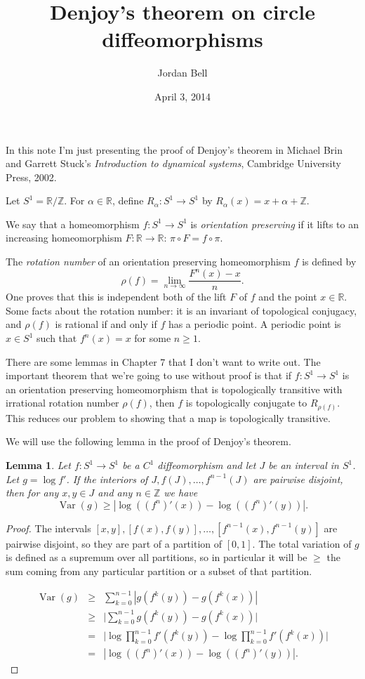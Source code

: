 \documentclass{article}
\newtheorem{lemma}[theorem]{Lemma}
\newcommand{\Var}[0]{\operatorname{Var}}
\theoremstyle{definition}
\begin{document}
\title{Denjoy's theorem on circle diffeomorphisms}
\author{Jordan Bell}
\date{April 3, 2014}
\maketitle

In this note I'm just presenting the proof of Denjoy's theorem in Michael Brin and Garrett Stuck's {\em Introduction
to dynamical systems}, Cambridge University Press, 2002. 

Let $S^1=\mathbb{R}/\mathbb{Z}$. For $\alpha \in \mathbb{R}$, define $R_\alpha:S^1 \to S^1$ by $R_\alpha(x)=x+\alpha
+\mathbb{Z}$.

We say that a homeomorphism $f:S^1 \to S^1$ is {\em orientation preserving} if it lifts to an increasing homeomorphism
$F:\mathbb{R} \to \mathbb{R}$: $\pi \circ F=f \circ \pi$.

The {\em rotation number} of an orientation preserving homeomorphism $f$ is defined by
\[
\rho(f)=\lim_{n \to \infty} \frac{F^n(x)-x}{n}.
\]
One proves that this is independent both of the lift $F$ of $f$ and the point $x \in \mathbb{R}$.
Some facts about the rotation number: it is an invariant of topological conjugacy, and $\rho(f)$ is rational if and only
if $f$ has a periodic point. A periodic point is $x \in S^1$ such that $f^n(x)=x$ for some $n \geq 1$.

There are some lemmas in Chapter 7 that I don't want to write out. The important theorem that
we're going to use without proof
is that if $f:S^1 \to S^1$ is an orientation preserving homeomorphism that is topologically
transitive with irrational rotation
number $\rho(f)$, then $f$ is topologically conjugate to $R_{\rho(f)}$. 
This reduces our problem to showing that a map is topologically transitive.

We will use the following lemma in the proof of Denjoy's theorem.

\begin{lemma}
Let $f:S^1 \to S^1$ be a $C^1$ diffeomorphism and
let $J$ be an interval in $S^1$. Let $g=\log f'$. If the interiors of $J,f(J),\ldots,f^{n-1}(J)$ are pairwise
disjoint, then for any $x, y \in J$ and any $n \in \mathbb{Z}$ we have
\[
\Var(g) \geq |\log((f^n)'(x))-\log((f^n)'(y))|.
\]
\end{lemma}
\begin{proof}
The intervals $[x,y], [f(x),f(y)], \ldots, [f^{n-1}(x),f^{n-1}(y)]$ are pairwise disjoint, so
they are part of a partition of $[0,1]$. The total variation of $g$ is defined as a supremum
over all partitions, so in particular it will be $\geq$ the sum coming from any particular
partition or a subset of that partition.

\begin{eqnarray*}
\Var(g)&\geq&\sum_{k=0}^{n-1} |g(f^k(y))-g(f^k(x))|\\
&\geq&\Big| \sum_{k=0}^{n-1} g(f^k(y))-g(f^k(x)) \Big|\\
&=&\Big| \log \prod_{k=0}^{n-1} f'(f^k(y))-\log \prod_{k=0}^{n-1} f'(f^k(x)) \Big|\\
&=&|\log((f^n)'(x))-\log((f^n)'(y))|.
\end{eqnarray*}
\end{proof}
\end{document}
